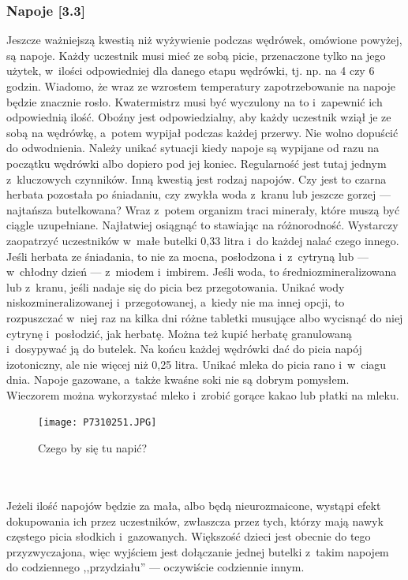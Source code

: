 \documentclass[a5paper,10pt,titlepage,twoside]{article}
\begin{document}
\subsubsection{Napoje [3.3]}
Jeszcze ważniejszą kwestią niż wyżywienie podczas wędrówek, omówione powyżej, są napoje. Każdy uczestnik musi mieć ze sobą picie, przenaczone tylko na jego użytek, w~ilości odpowiedniej dla danego etapu wędrówki, tj. np. na 4 czy 6 godzin. Wiadomo, że wraz ze wzrostem temperatury zapotrzebowanie na napoje będzie znacznie rosło. Kwatermistrz musi być wyczulony na to i~zapewnić ich odpowiednią ilość. Oboźny jest odpowiedzialny, aby każdy uczestnik wziął je ze sobą na wędrówkę, a~potem wypijał podczas każdej przerwy. Nie wolno dopuścić do odwodnienia. Należy unikać sytuacji kiedy napoje są wypijane od razu na początku wędrówki albo dopiero pod jej koniec. Regularność jest tutaj jednym z~kluczowych czynników. Inną kwestią jest rodzaj napojów. Czy jest to czarna herbata pozostała po śniadaniu, czy zwykła woda z~kranu lub jeszcze gorzej --- najtańsza butelkowana? Wraz z~potem organizm traci minerały, które muszą być ciągle uzupełniane. Najłatwiej osiągnąć to stawiając na różnorodność. Wystarczy zaopatrzyć uczestników w~małe butelki 0,33 litra i~do każdej nalać czego innego. Jeśli herbata ze śniadania, to nie za mocna, posłodzona i~z~cytryną lub --- w~chłodny dzień --- z~miodem i~imbirem. Jeśli woda, to średniozmineralizowana lub z~kranu, jeśli nadaje się do picia bez przegotowania. Unikać wody niskozmineralizowanej i~przegotowanej, a~kiedy nie ma innej opcji, to rozpuszczać w~niej raz na kilka dni różne tabletki musujące albo wycisnąć do niej cytrynę i~posłodzić, jak herbatę. Można też kupić herbatę granulowaną i~dosypywać ją do butelek. Na końcu każdej wędrówki dać do picia napój izotoniczny, ale nie więcej niż 0,25 litra. Unikać mleka do picia rano i~w~ciagu dnia. Napoje gazowane, a~także kwaśne soki nie są dobrym pomysłem. Wieczorem można wykorzystać mleko i~zrobić gorące kakao lub płatki na mleku.
\begin{figure}[htp]
\centering
\texttt{[image: P7310251.JPG]}
\caption{Czego by się tu napić?}\label{plecak-z-napojami}
\end{figure}
\\
\\
Jeżeli ilość napojów będzie za mała, albo będą nieurozmaicone, wystąpi efekt dokupowania ich przez uczestników, zwłaszcza przez tych, którzy mają nawyk częstego picia słodkich i~gazowanych. Większość dzieci jest obecnie do tego przyzwyczajona, więc wyjściem jest dołączanie jednej butelki z~takim napojem do codziennego ,,przydziału'' --- oczywiście codziennie innym.
\end{document}
